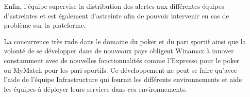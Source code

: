 Enfin, l’équipe supervise la distribution des alertes aux différentes équipes
d’astreintes et est également d’astreinte afin de pouvoir intervenir en cas de problème
sur la plateforme.

La concurrence très rude dans le domaine du poker et du pari sportif ainsi
que la volonté de se développer dans de nouveaux pays obligent Winamax à innover
constamment avec de nouvelles fonctionnalités comme l’Expresso pour le poker ou
MyMatch pour les pari sportifs. Ce développement ne peut se faire qu’avec l’aide de
l’équipe Infrastructure qui fournit les différents environnements et aide les équipes
à déployer leurs services dans ces environnements.
